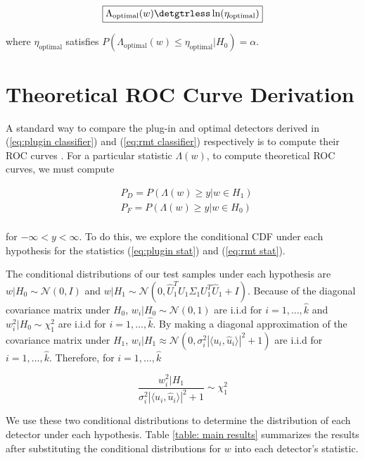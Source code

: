 \begin{equation}\label{eq:rmt classifier}
\boxed{\Lambda_{\text{optimal}}(w) \detgtrless \ln(\eta_{\text{optimal}})}
\end{equation}

where $\eta_{\text{optimal}}$ satisfies $P(\Lambda_{\text{optimal}}(w)\leq\eta_{\text{optimal}}|H_0)=\alpha$.

\section{Theoretical ROC Curve Derivation}\label{sec:roc}

A standard way to compare the plug-in and optimal detectors derived in (\ref{eq:plugin classifier}) and (\ref{eq:rmt classifier}) respectively is to compute their ROC curves \cite{fawcett2006introduction}. For a particular statistic $\Lambda(w)$, to compute theoretical ROC curves, we must compute

\begin{equation}\label{eq:target cdf}
\begin{aligned}
&P_D = P(\Lambda(w) \geq y| w\in H_1)\\
&P_F = P(\Lambda(w) \geq y| w\in H_0)\\
\end{aligned}
\end{equation}

for $-\infty<y<\infty$. To do this, we explore the conditional CDF under each hypothesis for the statistics (\ref{eq:plugin stat}) and (\ref{eq:rmt stat}).

The conditional distributions of our test samples under each hypothesis are $w|H_0\sim\mathcal{N}(0,I)$ and $w|H_1\sim\mathcal{N}(0,\widehat{U}^T_1U_1\Sigma_1U_1^T\widehat{U}_1+I)$. Because of the diagonal covariance matrix under $H_0$, $w_i|H_0\sim\mathcal{N}(0,1)$ are i.i.d for $i=1,\dots,\widehat{k}$ and $w_i^2|H_0\sim\chi_1^2$ are i.i.d for $i=1,\dots,\widehat{k}$. By making a diagonal approximation of the  covariance matrix under $H_1$,  $w_i|H_1\approx\mathcal{N}(0,\sigma^2_i|\langle u_i,\widehat{u}_i\rangle|^2+1)$ are i.i.d for $i=1,\dots,\widehat{k}$. Therefore, for $i=1,\dots,\widehat{k}$

\begin{equation*}
\frac{w_i^2|H_1}{\sigma^2_i|\langle u_i,\widehat{u}_i\rangle|^2+1}\sim\chi_1^2
\end{equation*}

We use these two conditional distributions to determine the distribution of each detector under each hypothesis. Table \ref{table: main results} summarizes the results after substituting the conditional distributions for $w$ into each detector's statistic.

